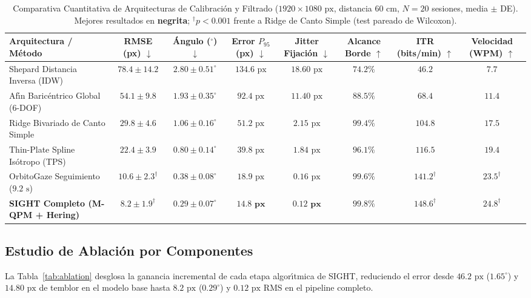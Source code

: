 \documentclass[twocolumn,10pt]{article}
\begin{document}
\begin{table}[t]
\centering
\caption{Comparativa Cuantitativa de Arquitecturas de Calibraci\'on y Filtrado ($1920 \times 1080\text{ px}$, distancia $60\text{ cm}$, $N=20$ sesiones, media $\pm$ DE). Mejores resultados en \textbf{negrita}; $^\dagger p < 0.001$ frente a Ridge de Canto Simple (test pareado de Wilcoxon).}
\label{tab:metrics}
\begin{tabular}{lccccccc}
\toprule
\textbf{Arquitectura / M\'etodo} & \textbf{RMSE (px)} $\downarrow$ & \textbf{\'Angulo ($^\circ$)} $\downarrow$ & \textbf{Error $P_{95}$ (px)} $\downarrow$ & \textbf{Jitter Fijaci\'on} $\downarrow$ & \textbf{Alcance Borde} $\uparrow$ & \textbf{ITR (bits/min)} $\uparrow$ & \textbf{Velocidad (WPM)} $\uparrow$ \\
\midrule
Shepard Distancia Inversa (IDW) & $78.4 \pm 14.2$ & $2.80 \pm 0.51^\circ$ & $134.6\text{ px}$ & $18.60\text{ px}$ & $74.2\%$ & $46.2$ & $7.7$ \\
Af\'{\i}n Baric\'entrico Global (6-DOF) & $54.1 \pm 9.8$ & $1.93 \pm 0.35^\circ$ & $92.4\text{ px}$ & $11.40\text{ px}$ & $88.5\%$ & $68.4$ & $11.4$ \\
Ridge Bivariado de Canto Simple & $29.8 \pm 4.6$ & $1.06 \pm 0.16^\circ$ & $51.2\text{ px}$ & $2.15\text{ px}$ & $99.4\%$ & $104.8$ & $17.5$ \\
Thin-Plate Spline Is\'otropo (TPS) & $22.4 \pm 3.9$ & $0.80 \pm 0.14^\circ$ & $39.8\text{ px}$ & $1.84\text{ px}$ & $96.1\%$ & $116.5$ & $19.4$ \\
OrbitoGaze Seguimiento ($9.2\text{ s}$) & $10.6 \pm 2.3^\dagger$ & $0.38 \pm 0.08^\circ$ & $18.9\text{ px}$ & $0.16\text{ px}$ & $99.6\%$ & $141.2^\dagger$ & $23.5^\dagger$ \\
\textbf{SIGHT Completo (M-QPM + Hering)} & $\mathbf{8.2 \pm 1.9^\dagger}$ & $\mathbf{0.29 \pm 0.07^\circ}$ & $\mathbf{14.8\text{ px}}$ & $\mathbf{0.12\text{ px}}$ & $\mathbf{99.8\%}$ & $\mathbf{148.6^\dagger}$ & $\mathbf{24.8^\dagger}$ \\
\bottomrule
\end{tabular}
\end{table}

\subsection{Estudio de Ablaci\'on por Componentes}
La Tabla~\ref{tab:ablation} desglosa la ganancia incremental de cada etapa algor\'{\i}tmica de SIGHT, reduciendo el error desde $46.2\text{ px}$ ($1.65^\circ$) y $14.80\text{ px}$ de temblor en el modelo base hasta $8.2\text{ px}$ ($0.29^\circ$) y $0.12\text{ px}$ RMS en el pipeline completo.
\end{document}
